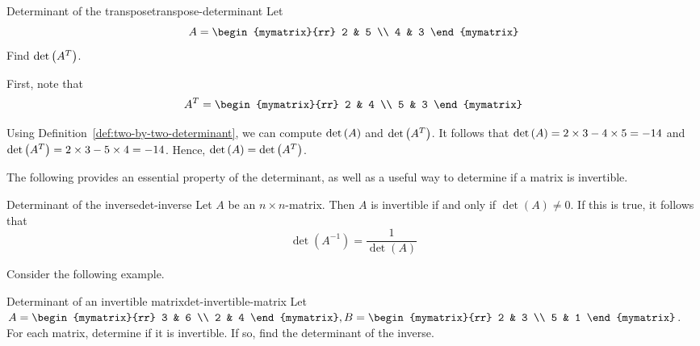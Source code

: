 \begin{example}{Determinant of the transpose}{transpose-determinant}
Let
\begin{equation*}
A
=
\begin{mymatrix}{rr}
2 & 5 \\
4 & 3
\end{mymatrix}
\end{equation*}
Find $\det \left(A^T\right)$.
\end{example}

\begin{solution}
First, note that 
\begin{equation*}
A^{T}
=
\begin{mymatrix}{rr}
2 & 4 \\
5 & 3
\end{mymatrix}
\end{equation*}

Using Definition~\ref{def:two-by-two-determinant}, we can compute $\det \left(A\right)$ and $\det \left(A^T\right)$. It follows that
$\det \left(A\right) = 2 \times 3 - 4 \times 5 = -14$ and $\det \left(A^T\right) = 2 \times 3 - 5 \times 4 = -14$. 
Hence, $\det \left(A\right) = \det \left(A^T\right)$.
\end{solution}

The following provides an essential property of the determinant, as well as a useful way to determine if a matrix is invertible.

\begin{theorem}{Determinant of the inverse}{det-inverse}
Let $A$ be an $n \times n$-matrix. Then $A$ is invertible if and only if $\det(A) \neq 0$. If this is true, it follows that 
\[
\det(A^{-1}) = \frac{1}{\det(A)}
\]
\end{theorem}

Consider the following example.

\begin{example}{Determinant of an invertible matrix}{det-invertible-matrix}
Let $A = \begin{mymatrix}{rr}
3 & 6 \\
2 & 4 
\end{mymatrix}, B = \begin{mymatrix}{rr}
2 & 3 \\
5 & 1
\end{mymatrix}$. For each matrix, determine if it is invertible. If so, find the determinant of the inverse. 
\end{example}

